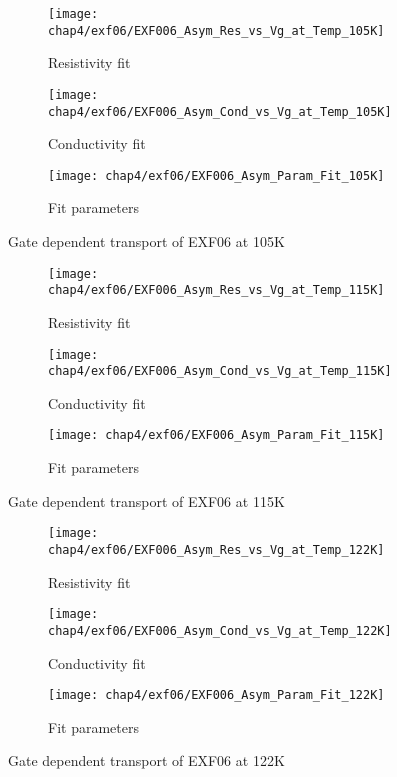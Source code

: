 \documentclass[../Matt_Gebert_Honours_Thesis.tex]{subfiles}
\begin{document}
	\begin{figure}[H]
		\centering
		\begin{subfigure}{0.4\textwidth}
			\centering
			\texttt{[image: chap4/exf06/EXF006\_Asym\_Res\_vs\_Vg\_at\_Temp\_105K]}
			\caption{Resistivity fit}
		\end{subfigure}
		\begin{subfigure}{0.4\textwidth}
			\centering
			\texttt{[image: chap4/exf06/EXF006\_Asym\_Cond\_vs\_Vg\_at\_Temp\_105K]}
			\caption{Conductivity fit}
		\end{subfigure}
		\begin{subfigure}{0.16\textwidth}
			\centering
			\texttt{[image: chap4/exf06/EXF006\_Asym\_Param\_Fit\_105K]}
			\caption{Fit parameters}
		\end{subfigure}
		\caption*{Gate dependent transport of EXF06 at 105K}
	\end{figure}
	\begin{figure}[H]
		\centering
		\begin{subfigure}{0.4\textwidth}
			\centering
			\texttt{[image: chap4/exf06/EXF006\_Asym\_Res\_vs\_Vg\_at\_Temp\_115K]}
			\caption{Resistivity fit}
		\end{subfigure}
		\begin{subfigure}{0.4\textwidth}
			\centering
			\texttt{[image: chap4/exf06/EXF006\_Asym\_Cond\_vs\_Vg\_at\_Temp\_115K]}
			\caption{Conductivity fit}
		\end{subfigure}
		\begin{subfigure}{0.16\textwidth}
			\centering
			\texttt{[image: chap4/exf06/EXF006\_Asym\_Param\_Fit\_115K]}
			\caption{Fit parameters}
		\end{subfigure}
		\caption*{Gate dependent transport of EXF06 at 115K}
	\end{figure}
	\begin{figure}[H]
		\centering
		\begin{subfigure}{0.4\textwidth}
			\centering
			\texttt{[image: chap4/exf06/EXF006\_Asym\_Res\_vs\_Vg\_at\_Temp\_122K]}
			\caption{Resistivity fit}
		\end{subfigure}
		\begin{subfigure}{0.4\textwidth}
			\centering
			\texttt{[image: chap4/exf06/EXF006\_Asym\_Cond\_vs\_Vg\_at\_Temp\_122K]}
			\caption{Conductivity fit}
		\end{subfigure}
		\begin{subfigure}{0.16\textwidth}
			\centering
			\texttt{[image: chap4/exf06/EXF006\_Asym\_Param\_Fit\_122K]}
			\caption{Fit parameters}
		\end{subfigure}
		\caption*{Gate dependent transport of EXF06 at 122K}
	\end{figure}
\end{document}
